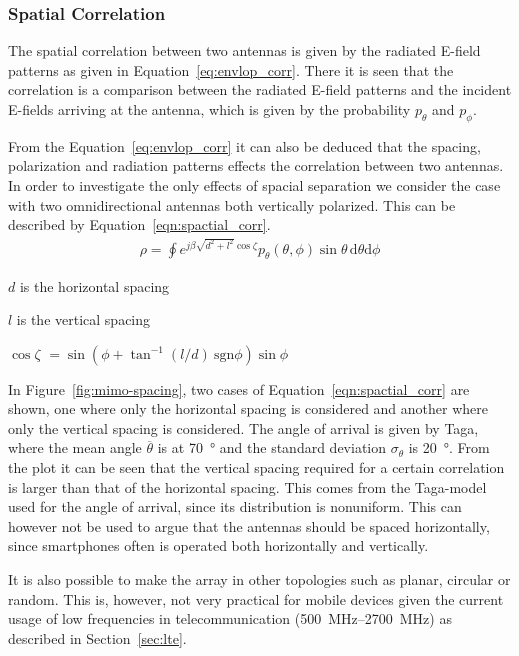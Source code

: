 
\subsubsection{Spatial Correlation}
The spatial correlation between two antennas is given by the radiated E-field patterns as given in Equation~\ref{eq:envlop_corr}. There it is seen that the correlation is a comparison between the radiated E-field patterns and the incident E-fields arriving at the antenna, which is given by the probability $p_\theta$ and $p_\phi$. 

From the Equation~\ref{eq:envlop_corr} it can also be deduced that the spacing, polarization and radiation patterns effects the correlation between two antennas. In order to investigate the only effects of spacial separation we consider the case with two omnidirectional antennas both vertically polarized. This can be described by Equation~\ref{eqn:spactial_corr}\cite{Tim2012Practical}.
\begin{align}
\label{eqn:spactial_corr}
  \rho = \oint e^{j\beta \sqrt{d^2+l^2}\cos\zeta}p_\theta(\theta,\phi)\sin\theta \, \mathrm{d} \theta \mathrm{d} \phi
\end{align}
\begin{where}
\item[$d$] is the horizontal spacing
\item[$l$] is the vertical spacing
\item[$\cos \zeta$] $= \sin(\phi + \tan^{-1}(l/d)\ \text{sgn}\phi)\sin\phi$   
\end{where}

In Figure~\ref{fig:mimo-spacing}, two cases of Equation~\ref{eqn:spactial_corr} are shown, one where only the horizontal spacing is considered and another where only the vertical spacing is considered. The angle of arrival is given by Taga, where the mean angle $\overline{\theta}$ is at \SI{70}{\degree} and the standard deviation $\sigma_\theta$ is \SI{20}{\degree}. From the plot it can be seen that the vertical spacing required for a certain correlation is larger than that of the horizontal spacing. This comes from the Taga-model used for the angle of arrival, since its distribution is nonuniform. This can however not be used to argue that the antennas should be spaced horizontally, since smartphones often is operated both horizontally and vertically. 

It is also possible to make the array in other topologies such as planar, circular or random. This is, however, not very practical for mobile devices given the current usage of low frequencies in telecommunication (\SIrange{500}{2700}{MHz}) as described in Section~\ref{sec:lte}.

